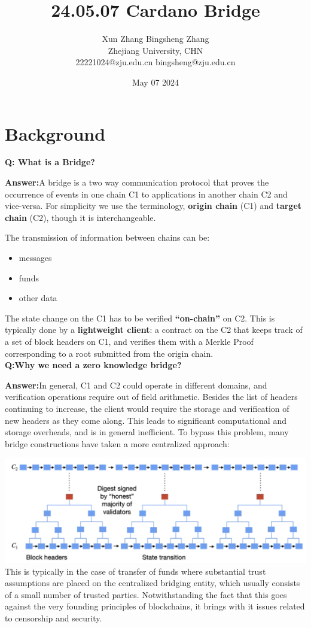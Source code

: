 \documentclass{article}
\title{24.05.07 Cardano Bridge}
\author{Xun Zhang \quad \quad Bingsheng Zhang \\ 
Zhejiang University, CHN \\
22221024@zju.edu.cn \quad bingsheng@zju.edu.cn}
\date{May 07 2024}
\begin{document}
\maketitle

\section{Background}

\textbf{Q: What is a Bridge?}

\noindent\textbf{Answer:}A bridge is a two way communication protocol that proves the occurrence of events in one chain C1 to applications in another chain C2 and vice-versa. For simplicity we use the terminology, \textbf{origin chain }(C1) and \textbf{target chain} (C2), though it is interchangeable.


The transmission of information between chains can be:
\begin{itemize}
    \item messages
    \item funds
    \item other data
\end{itemize}

The state change on the C1 has to be verified \textbf{“on-chain”} on C2. This is typically done by a \textbf{lightweight client}: a contract on the C2 that keeps track of a set of block headers on C1, and verifies them with a Merkle Proof corresponding to a root submitted from the origin chain. 
\\

\noindent\textbf{Q:Why we need a zero knowledge bridge?}

\noindent\textbf{Answer:}In general, C1 and C2 could operate in different domains, and verification operations require out of field arithmetic. Besides the list of headers continuing to increase, the client would require the storage and verification of new headers as they come along. This leads to significant computational and storage overheads, and is in general inefficient. To bypass this problem, many bridge constructions have taken a more centralized approach:

\includegraphics[width=1\linewidth]{2024-05-01 144803.png}
This is typically in the case of transfer of funds where substantial trust assumptions are placed on the centralized bridging entity, which usually consists of a small number of trusted parties. Notwithstanding the fact that this goes against the very founding principles of blockchains, it brings with it issues related to censorship and security.
\end{document}
